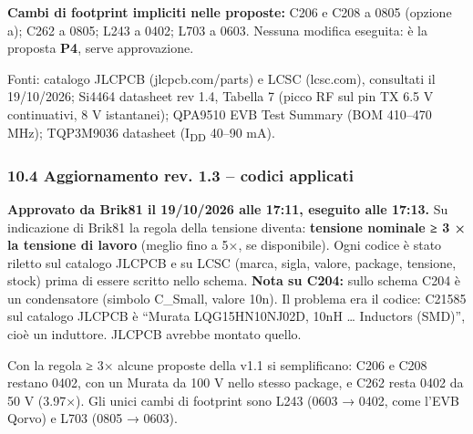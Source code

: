 \textbf{Cambi di footprint impliciti nelle proposte:} C206 e C208 a 0805 (opzione a); C262 a 0805; L243 a 0402; L703 a 0603. Nessuna modifica eseguita: è la proposta \textbf{P4}, serve approvazione.

{\small Fonti: catalogo JLCPCB (jlcpcb.com/\allowbreak{}parts) e LCSC (lcsc.com), consultati il 19/\allowbreak{}10/\allowbreak{}2026; Si4464 datasheet rev 1.4, Tabella 7 (picco RF sul pin TX 6.5 V continuativi, 8 V istantanei); QPA9510 EVB Test Summary (BOM 410–470 MHz); TQP3M9036 datasheet (I\textsubscript{DD} 40–90 mA).}

\subsubsection[10.4 Aggiornamento rev. 1.3 – codici applicati]{10.4 Aggiornamento rev. 1.3 – codici applicati}

\begin{okbox}
\textbf{Approvato da Brik81 il 19/\allowbreak{}10/\allowbreak{}2026 alle 17:11, eseguito alle 17:13.} Su indicazione di Brik81 la regola della tensione diventa: \textbf{tensione nominale ≥ 3 × la tensione di lavoro} (meglio fino a 5×, se disponibile). Ogni codice è stato riletto sul catalogo JLCPCB e su LCSC (marca, sigla, valore, package, tensione, stock) prima di essere scritto nello schema.\newline{} \textbf{Nota su C204:} sullo schema C204 è un condensatore (simbolo C\_\allowbreak{}Small, valore 10n). Il problema era il codice: C21585 sul catalogo JLCPCB è \textquotedblleft{}Murata LQG15HN10NJ02D, 10nH … Inductors (SMD)\textquotedblright{}, cioè un induttore. JLCPCB avrebbe montato quello.
\end{okbox}

Con la regola ≥ 3× alcune proposte della v1.1 si semplificano: C206 e C208 restano 0402, con un Murata da 100 V nello stesso package, e C262 resta 0402 da 50 V (3.97×). Gli unici cambi di footprint sono L243 (0603 → 0402, come l'EVB Qorvo) e L703 (0805 → 0603).


